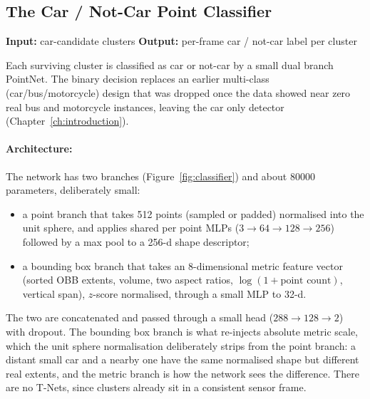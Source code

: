 \documentclass[a4paper,12pt]{report}
\begin{document}
\subsection{The Car / Not-Car Point Classifier}
\label{sec:pipeline-classifier}

\noindent \textbf{Input:} car-candidate clusters \quad \textbar \quad \textbf{Output:} per-frame car / not-car label per cluster \vspace{0.5em}

Each surviving cluster is classified as car or not-car by a small
dual branch PointNet. The binary decision
replaces
an earlier multi-class (car/bus/motorcycle) design that was dropped once the data
showed near zero real bus and motorcycle instances, leaving the car only detector
(Chapter~\ref{ch:introduction}).

\paragraph{Architecture:} The network has two branches
(Figure~\ref{fig:classifier}) and about \num{80000}
parameters, deliberately small:
\begin{itemize}
  \item a point branch that takes \num{512} points (sampled or padded)
    normalised into the unit sphere, and applies shared per point MLPs
    ($3 \to 64 \to 128 \to 256$) followed by a max pool to a \num{256}-d shape
    descriptor;
  \item a bounding box branch that takes an \num{8}-dimensional metric
    feature vector (sorted OBB extents, volume, two aspect ratios,
    $\log(1+\text{point count})$, vertical span), $z$-score normalised, through a
    small MLP to \num{32}-d.
\end{itemize}
The two are concatenated and passed through a small head
($288 \to 128 \to 2$) with dropout. The bounding box branch is what re-injects
absolute metric scale, which the unit sphere normalisation deliberately strips
from the point branch: a distant small car and a nearby one have the same
normalised shape but different real extents, and the metric branch is how the
network sees the difference. There are no T-Nets, since clusters already sit in a
consistent sensor frame.
\end{document}
